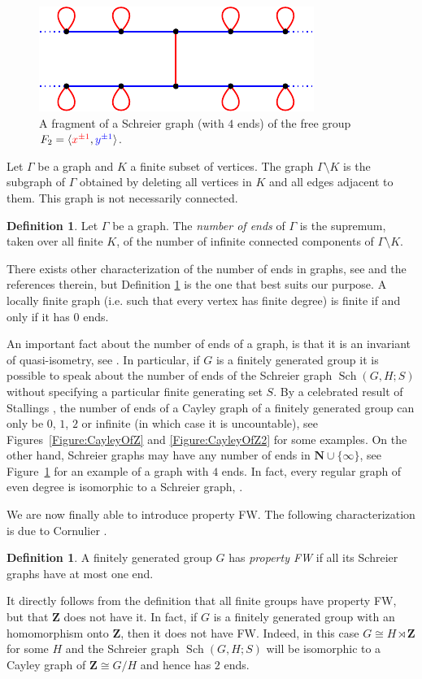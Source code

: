 \documentclass[a4paper]{article}
\theoremstyle{definition}
\newtheorem{defn}[lem]{Definition}
\theoremstyle{remark}%
\DeclareMathOperator\Sch{Sch}
\newcommand*{\field}[1]{\mathbf{#1}}
\newcommand*{\Z}{\field{Z}}
\begin{document}
%
%
%
%
%
\begin{figure}[htbp]\centering
\includegraphics{SchreierOfF2}
\caption{A fragment of a Schreier graph (with $4$ ends) of the free group $F_2=\langle \textcolor{red}{x^{\pm1}},\textcolor{blue}{y^{\pm1}}\rangle$.}
\label{Figure:SchreierOfF2}
\end{figure}
%
%

Let $\Gamma$ be a graph and $K$ a finite subset of vertices. The graph $\Gamma\setminus K$ is the subgraph of $\Gamma$ obtained by deleting all vertices in $K$ and all edges adjacent to them. This graph is not necessarily connected.
\begin{defn}\label{Def:Ends}
Let $\Gamma$ be a graph. The \emph{number of ends} of $\Gamma$ is the supremum, taken over all finite $K$, of the number of infinite connected components of $\Gamma\setminus K$.
\end{defn}
There exists other characterization of the number of ends in graphs, see \cite{MR1967888} and the references therein, but Definition \ref{Def:Ends} is the one that best suits our purpose.
A locally finite graph (i.e. such that every vertex has finite degree) is finite if and only if it has $0$ ends.

An important fact about the number of ends of a graph, is that it is an invariant of quasi-isometry, see \cite{MR1213151}. In particular, if $G$ is a finitely generated group it is possible to speak about the number of ends of the Schreier graph $\Sch(G,H;S)$ without specifying a particular finite generating set $S$.
By a celebrated result of Stallings \cite{Stallings1971}, the number of ends of a Cayley graph of a finitely generated group can only be $0$, $1$, $2$ or infinite (in which case it is uncountable), see Figures~\ref{Figure:CayleyOfZ} and \ref{Figure:CayleyOfZ2} for some examples.
On the other hand, Schreier graphs may have any number of ends in $\mathbf N\cup\{\infty\}$, see Figure~\ref{Figure:SchreierOfF2} for an example of a graph with $4$ ends.
In fact, every regular graph of even degree is isomorphic to a Schreier graph, \cite{MR0450121,MR1358635}. 

We are now finally able to introduce property FW. The following characterization is due to Cornulier \cite{Cornulier2013}.
%
%
\begin{defn}
A finitely generated group $G$ has \emph{property FW} if all its Schreier graphs have at most one end.
\end{defn}
%
%
It directly follows from the definition that all finite groups have property FW, but that $\Z$ does not have it.
In fact, if $G$ is a finitely generated group with an homomorphism onto $\Z$, then it does not have FW. Indeed, in this case $G\cong H\rtimes \Z$  for some $H$ and the Schreier graph $\Sch(G,H;S)$ will be isomorphic to a Cayley graph of $\Z\cong G/H$ and hence has $2$ ends.
\end{document}
